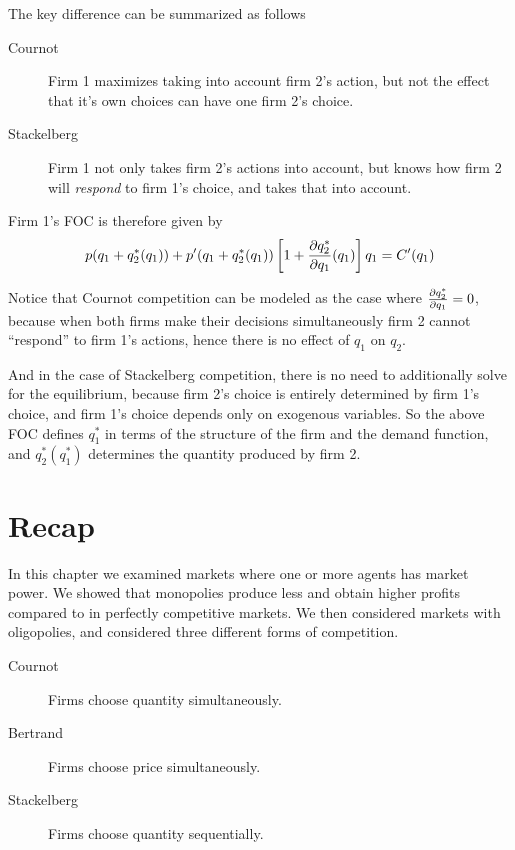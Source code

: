 The key difference can be summarized as follows
\begin{description}
    \item[Cournot] Firm 1 maximizes taking into account firm 2's action, but not the effect that it's own choices can have one firm 2's choice.
    \item[Stackelberg] Firm 1 not only takes firm 2's actions into account, but knows how firm 2 will \emph{respond} to firm 1's choice, and takes that into account.
\end{description}

Firm 1's FOC is therefore given by 
\begin{align*}
    p(q_1 + q_2^*(q_1)) + p'(q_1 + q_2^*(q_1))\left[1 + \frac{\partial q_2^*}{\partial q_1}(q_1)\right] q_1 = C'(q_1)
\end{align*}

Notice that Cournot competition can be modeled as the case where $\frac{\partial q_2^*}{\partial q_1} = 0$, because when both firms make their decisions simultaneously firm 2 cannot ``respond'' to firm 1's actions, hence there is no effect of $q_1$ on $q_2$. 

And in the case of Stackelberg competition, there is no need to additionally solve for the equilibrium, because firm 2's choice is entirely determined by firm 1's choice, and firm 1's choice depends only on exogenous variables. So the above FOC defines $q_1^*$ in terms of the structure of the firm and the demand function, and $q_2^*(q_1^*)$ determines the quantity produced by firm 2. 


\section*{Recap}
In this chapter we examined markets where one or more agents has market power. We showed that monopolies produce less and obtain higher profits compared to in perfectly competitive markets. We then considered markets with oligopolies, and considered three different forms of competition. 
\begin{description}
    \item[Cournot] Firms choose quantity simultaneously.
    \item[Bertrand] Firms choose price simultaneously.
    \item[Stackelberg] Firms choose quantity sequentially.   
\end{description}

